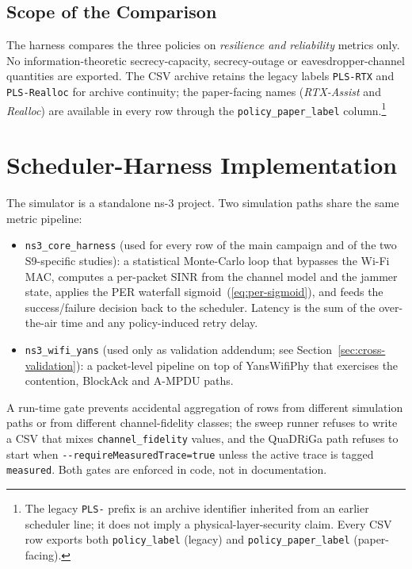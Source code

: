 \documentclass[journal,onecolumn,11pt,a4paper]{IEEEtran}
\begin{document}
\subsection{Scope of the Comparison}
\label{sec:scope}

The harness compares the three policies on \emph{resilience and
reliability} metrics only. No information-theoretic
secrecy-capacity, secrecy-outage or eavesdropper-channel quantities
are exported. The CSV archive retains the legacy labels
\texttt{PLS-RTX} and \texttt{PLS-Realloc} for archive continuity;
the paper-facing names (\emph{RTX-Assist} and \emph{Realloc}) are
available in every row through the \texttt{policy\_paper\_label}
column.\footnote{The legacy \texttt{PLS-} prefix is an archive
identifier inherited from an earlier scheduler line; it does not
imply a physical-layer-security claim. Every CSV row exports both
\texttt{policy\_label} (legacy) and \texttt{policy\_paper\_label}
(paper-facing).}

\section{Scheduler-Harness Implementation}
\label{sec:harness}

The simulator is a standalone ns-3 \cite{HLR08,LH06} project. Two
simulation paths share the same metric pipeline:

\begin{itemize}
  \item \texttt{ns3\_core\_harness} (used for every row of the main
        campaign and of the two S9-specific studies): a statistical
        Monte-Carlo loop that bypasses the Wi-Fi MAC, computes a
        per-packet SINR from the channel model and the jammer state,
        applies the PER waterfall sigmoid~(\ref{eq:per-sigmoid}), and
        feeds the success/failure decision back to the scheduler.
        Latency is the sum of the over-the-air time and any
        policy-induced retry delay.
  \item \texttt{ns3\_wifi\_yans} (used only as validation addendum;
        see Section~\ref{sec:cross-validation}): a packet-level
        pipeline on top of YansWifiPhy \cite{LH06} that exercises
        the contention, BlockAck and A-MPDU paths.
\end{itemize}

A run-time gate prevents accidental aggregation of rows from
different simulation paths or from different channel-fidelity classes;
the sweep runner refuses to write a CSV that mixes
\texttt{channel\_fidelity} values, and the QuaDRiGa path refuses to
start when \texttt{-{}-requireMeasuredTrace=true} unless the active
trace is tagged \texttt{measured}. Both gates are enforced in code,
not in documentation.
\end{document}
